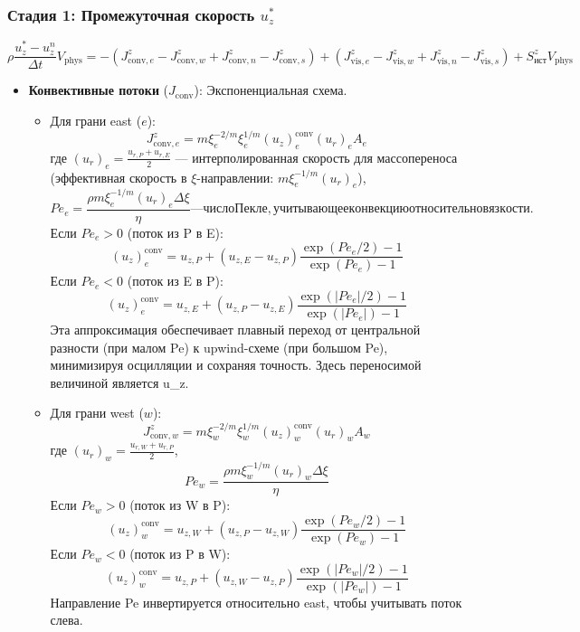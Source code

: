 \documentclass[a4paper,12pt]{article}
\begin{document}
\subsubsection*{Стадия 1: Промежуточная скорость \(u_z^*\)}
\[
\rho \frac{u_z^* - u_z^n}{\Delta t} V_{\text{phys}} = - (J_{\text{conv},e}^z - J_{\text{conv},w}^z + J_{\text{conv},n}^z - J_{\text{conv},s}^z) + (J_{\text{vis},e}^z - J_{\text{vis},w}^z + J_{\text{vis},n}^z - J_{\text{vis},s}^z) + S_{\text{ист}}^z V_{\text{phys}}
\]
\begin{itemize}
    \item \textbf{Конвективные потоки} (\(J_{\text{conv}}\)): Экспоненциальная схема.
    \begin{itemize}
        \item Для грани east (\(e\)):
        \[
        J_{\text{conv},e}^z = m \xi_e^{-2/m} \xi_e^{1/m} (u_z)_e^{\text{conv}} (u_r)_e A_e
        \]
        где \((u_r)_e = \frac{u_{r,P} + u_{r,E}}{2}\) — интерполированная скорость для массопереноса (эффективная скорость в \(\xi\)-направлении: \(m \xi_e^{-1/m} (u_r)_e\)),
        \[
        Pe_e = \frac{\rho m \xi_e^{-1/m} (u_r)_e \Delta \xi}{\eta} — число Пекле, учитывающее конвекцию относительно вязкости.
        \]
        Если \(Pe_e > 0\) (поток из P в E):
        \[
        (u_z)_e^{\text{conv}} = u_{z,P} + (u_{z,E} - u_{z,P}) \frac{\exp(Pe_e / 2) - 1}{\exp(Pe_e) - 1}
        \]
        Если \(Pe_e < 0\) (поток из E в P):
        \[
        (u_z)_e^{\text{conv}} = u_{z,E} + (u_{z,P} - u_{z,E}) \frac{\exp(|Pe_e| / 2) - 1}{\exp(|Pe_e|) - 1}
        \]
        Эта аппроксимация обеспечивает плавный переход от центральной разности (при малом Pe) к upwind-схеме (при большом Pe), минимизируя осцилляции и сохраняя точность. Здесь переносимой величиной является u_z.

        \item Для грани west (\(w\)):
        \[
        J_{\text{conv},w}^z = m \xi_w^{-2/m} \xi_w^{1/m} (u_z)_w^{\text{conv}} (u_r)_w A_w
        \]
        где \((u_r)_w = \frac{u_{r,W} + u_{r,P}}{2}\),
        \[
        Pe_w = \frac{\rho m \xi_w^{-1/m} (u_r)_w \Delta \xi}{\eta}
        \]
        Если \(Pe_w > 0\) (поток из W в P):
        \[
        (u_z)_w^{\text{conv}} = u_{z,W} + (u_{z,P} - u_{z,W}) \frac{\exp(Pe_w / 2) - 1}{\exp(Pe_w) - 1}
        \]
        Если \(Pe_w < 0\) (поток из P в W):
        \[
        (u_z)_w^{\text{conv}} = u_{z,P} + (u_{z,W} - u_{z,P}) \frac{\exp(|Pe_w| / 2) - 1}{\exp(|Pe_w|) - 1}
        \]
        Направление Pe инвертируется относительно east, чтобы учитывать поток слева.


\end{itemize}
\end{itemize}
\end{document}
